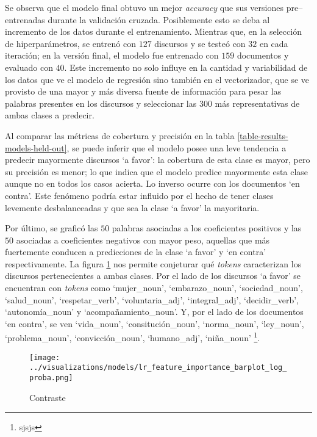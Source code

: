 Se observa que el modelo final obtuvo un mejor \textit{accuracy} que sus
versiones pre{--}entrenadas durante la validación cruzada. Posiblemente
esto se deba al incremento de los datos durante el entrenamiento.
Mientras que, en la selección de hiperparámetros, se entrenó con $127$ discursos
y se testeó con $32$ en cada iteración; en la versión final, el modelo fue entrenado
con $159$ documentos y evaluado con $40$. Este incremento no solo influye en
la cantidad y variabilidad de los datos que ve el modelo de regresión sino
también en el vectorizador, que se ve provisto de una mayor y más diversa fuente
de información para pesar las palabras presentes en los discursos y seleccionar
las $300$ más representativas de ambas clases a predecir.
\par
Al comparar las métricas de cobertura y precisión en la tabla
\ref{table-results-models-held-out}, se puede inferir que el modelo posee
una leve tendencia a predecir mayormente discursos `a favor': la cobertura
de esta clase es mayor, pero su precisión es menor; lo que indica que el modelo
predice mayormente esta clase aunque no en todos los casos acierta. Lo inverso
ocurre con los documentos `en contra'. Este fenómeno podría estar influido
por el hecho de tener clases levemente desbalanceadas y que sea la clase `a favor'
la mayoritaria.
\par
Por último, se graficó las $50$ palabras asociadas a los coeficientes positivos
y las $50$ asociadas a coeficientes negativos con mayor peso, aquellas que más
fuertemente conducen a predicciones de la clase `a favor' y `en contra' respectivamente.
La figura \ref{fig-results-models-feature-importance} nos permite conjeturar qué
\textit{tokens} caracterizan los discursos pertenecientes a ambas clases. Por el lado de los
discursos `a favor' se encuentran con \textit{tokens} como `mujer\_noun', `embarazo\_noun',
`sociedad\_noun', `salud\_noun', `respetar\_verb', `voluntaria\_adj', `integral\_adj',
`decidir\_verb', `autonomía\_noun' y `acompañamiento\_noun'. Y, por el lado de los
documentos `en contra', se ven `vida\_noun', `consitución\_noun', `norma\_noun',
`ley\_noun', `problema\_noun', `convicción\_noun', `humano\_adj', `niña\_noun'
\footnote{sjsjs}.

\begin{figure}[h!]
    \centering
    \texttt{[image: ../visualizations/models/lr\_feature\_importance\_barplot\_log\_proba.png]}
    \caption{Contraste}
    \label{fig-results-models-feature-importance}
\end{figure}